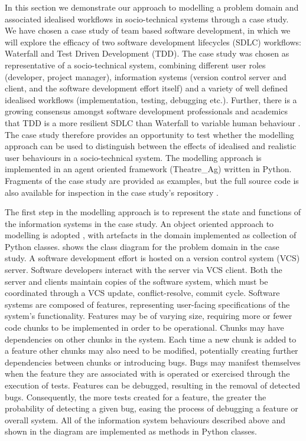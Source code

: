 \documentclass{llncs}
\begin{document}
In this section we demonstrate our approach to modelling a problem domain and associated idealised workflows in
socio-technical systems through a case study.  We have chosen a case study of team based software development, in which
we will explore the efficacy of two software development lifecycles (SDLC) workflows: Waterfall and Test Driven
Development (TDD).  The case study was chosen as representative of a socio-technical system, combining different user
roles (developer, project manager), information systems (version control server and client, and the software development
effort itself) and a variety of well defined idealised workflows (implementation, testing, debugging etc.).  Further,
there is a growing consensus amongst software development professionals and academics that TDD is a more resilient SDLC
than Waterfall to variable human behaviour
\citep{Bhat2006TestDrivenDevelopment,George2004TestDrivenDevelopment,Huang2009EmpiricalTestFirstProgramming}.  The case
study therefore provides an opportunity to test whether the modelling approach can be used to distinguish between the
effects of idealised and realistic user behaviours in a socio-technical system.  The modelling approach is implemented
in an agent oriented framework (Theatre\_Ag) written in Python.  Fragments of the case study are provided as examples,
but the full source code is also available for inspection in the case study's repository 
\cite{storer2016softdev-workflow-scm}.

The first step in the modelling approach is to represent the state and functions of the information systems in the case
study. An object oriented approach to modelling is adopted \cite{omg07omguml}, with artefacts in the domain
implemented as collection of Python classes.   shows the class diagram for the problem domain in
the case study.  A software development effort is hosted on a version control system (VCS) server.  Software developers
interact with the server via VCS client.  Both the server and clients maintain copies of the software system, which must
be coordinated through a VCS update, conflict-resolve, commit cycle.  Software systems are composed of features,
representing user-facing specifications of the system's functionality.  Features may be of varying size, requiring more
or fewer code chunks to be implemented in order to be operational.  Chunks may have dependencies on other chunks in the
system.  Each time a new chunk is added to a feature other chunks may also need to be modified, potentially creating
further dependencies between chunks or introducing bugs.  Bugs may manifest themselves when the feature they are
associated with is operated or exercised through the execution of tests.  Features can be debugged, resulting in the
removal of detected bugs.  Consequently, the more tests created for a feature, the greater the probability of detecting
a given bug, easing the process of debugging a feature or overall system. All of the information system behaviours
described above and shown in the diagram are implemented as methods in Python classes.
\end{document}
